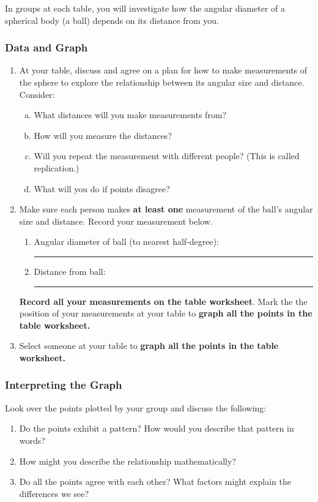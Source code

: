 \documentclass[main.tex]{subfiles}
\begin{document}
In groups at each table, you will investigate how the angular diameter of a spherical body (a ball) depends on its distance from you.

\subsubsection{Data and Graph}
\begin{enumerate}
\item At your table, discuss and agree on a plan for how to make measurements of the sphere to explore the relationship between its angular size and distance. Consider:
	\begin{enumerate}[a.]
	\item What distances will you make measurements from?
	\item How will you measure the distances?
	\item Will you repeat the measurement with different people? (This is called replication.)
	\item What will you do if points disagree?
	\end{enumerate}

\item Make sure each person makes \textbf{at least one} measurement of the ball's angular size and distance. Record your measurement below.
	\begin{enumerate}
	\item Angular diameter of ball (to nearest half-degree): \rule{2cm}{.15mm}
	\item Distance from ball: \rule{2cm}{.15mm}
	\end{enumerate}
    
\textbf{Record all your measurements on the table worksheet}. Mark the the position of your measurements at your table to \textbf{graph all the points in the table worksheet.}

\item Select someone at your table to \textbf{graph all the points in the table worksheet.}
\end{enumerate}

\subsubsection{Interpreting the Graph}
Look over the points plotted by your group and discuss the following:
\begin{enumerate}
\item Do the points exhibit a pattern? How would you describe that pattern in words?
\item How might you describe the relationship mathematically?
\item Do all the points agree with each other? What factors might explain the differences we see?
\end{enumerate}
\end{document}
